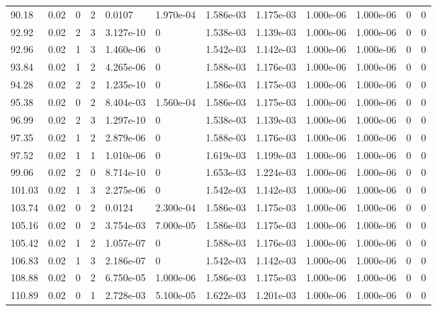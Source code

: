\documentclass[preview]{standalone}
\begin{document}
{{{\begin{tabular}{L{1.2cm}C{1.2cm} C{0.3cm}C{0.5cm} C{1.4cm}C{1.4cm} C{1.4cm}C{1.4cm} C{1.6cm}C{1.6cm} C{1.6cm}C{1.6cm}}
  90.18  &  0.02  & 0     &  2 &  0.0107  & 1.970e-04  &  1.586e-03&   1.175e-03& 1.000e-06 & 1.000e-06   &  0 & 0  \\ 
  92.92  &  0.02  & 2     &  3 &  3.127e-10  & 0  &  1.538e-03&   1.139e-03& 1.000e-06 & 1.000e-06   &  0 & 0  \\ 
  92.96  &  0.02  & 1     &  3 &  1.460e-06  & 0  &  1.542e-03&   1.142e-03& 1.000e-06 & 1.000e-06   &  0 & 0  \\ 
  93.84  &  0.02  & 1     &  2 &  4.265e-06  & 0  &  1.588e-03&   1.176e-03& 1.000e-06 & 1.000e-06   &  0 & 0  \\ 
  94.28  &  0.02  & 2     &  2 &  1.235e-10  & 0  &  1.586e-03&   1.175e-03& 1.000e-06 & 1.000e-06   &  0 & 0  \\ 
  95.38  &  0.02  & 0     &  2 &  8.404e-03  & 1.560e-04  &  1.586e-03&   1.175e-03& 1.000e-06 & 1.000e-06   &  0 & 0  \\ 
  96.99  &  0.02  & 2     &  3 &  1.297e-10  & 0  &  1.538e-03&   1.139e-03& 1.000e-06 & 1.000e-06   &  0 & 0  \\ 
  97.35  &  0.02  & 1     &  2 &  2.879e-06  & 0  &  1.588e-03&   1.176e-03& 1.000e-06 & 1.000e-06   &  0 & 0  \\ 
  97.52  &  0.02  & 1     &  1 &  1.010e-06  & 0  &  1.619e-03&   1.199e-03& 1.000e-06 & 1.000e-06   &  0 & 0  \\ 
  99.06  &  0.02  & 2     &  0 &  8.714e-10  & 0  &  1.653e-03&   1.224e-03& 1.000e-06 & 1.000e-06   &  0 & 0  \\ 
  101.03  &  0.02  & 1     &  3 &  2.275e-06  & 0  &  1.542e-03&   1.142e-03& 1.000e-06 & 1.000e-06   &  0 & 0  \\ 
  103.74  &  0.02  & 0     &  2 &  0.0124  & 2.300e-04  &  1.586e-03&   1.175e-03& 1.000e-06 & 1.000e-06   &  0 & 0  \\ 
  105.16  &  0.02  & 0     &  2 &  3.754e-03  & 7.000e-05  &  1.586e-03&   1.175e-03& 1.000e-06 & 1.000e-06   &  0 & 0  \\ 
  105.42  &  0.02  & 1     &  2 &  1.057e-07  & 0  &  1.588e-03&   1.176e-03& 1.000e-06 & 1.000e-06   &  0 & 0  \\ 
  106.83  &  0.02  & 1     &  3 &  2.186e-07  & 0  &  1.542e-03&   1.142e-03& 1.000e-06 & 1.000e-06   &  0 & 0  \\ 
  108.88  &  0.02  & 0     &  2 &  6.750e-05  & 1.000e-06  &  1.586e-03&   1.175e-03& 1.000e-06 & 1.000e-06   &  0 & 0  \\ 
  110.89  &  0.02  & 0     &  1 &  2.728e-03  & 5.100e-05  &  1.622e-03&   1.201e-03& 1.000e-06 & 1.000e-06   &  0 & 0  \\ 

\end{tabular}}}}
\end{document}
